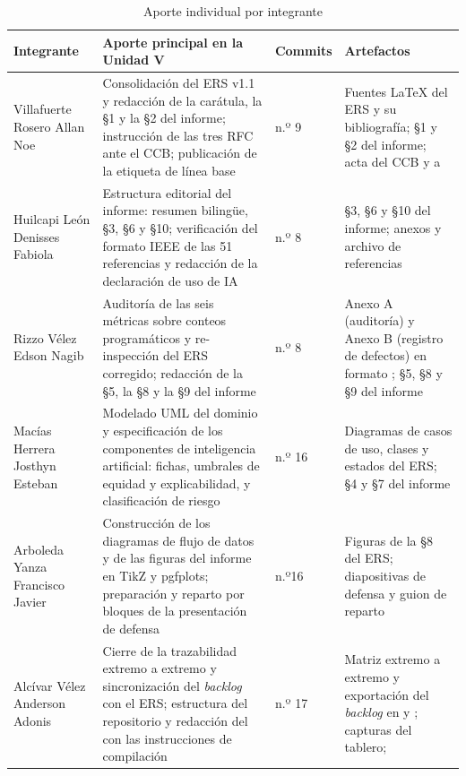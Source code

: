 \begin{table}[H]
\centering\footnotesize
\caption{Aporte individual por integrante}
\label{tab:aporte}
\begin{tabular}{|L{3.1cm}|L{5.2cm}|C{1.5cm}|L{4.8cm}|}
\hline
{}\textbf{Integrante} & \textbf{Aporte principal en la Unidad V} & \textbf{Commits} & \textbf{Artefactos}\\ \hline
Villafuerte Rosero Allan Noe & Consolidación del ERS v1.1 y redacción de la carátula, la \S1 y la \S2 del informe; instrucción de las tres RFC ante el CCB; publicación de la etiqueta de línea base & {n.º 9} & Fuentes \LaTeX{} del ERS y su bibliografía; \S1 y \S2 del informe; acta del CCB y  a \\ \hline
Huilcapi León Denisses Fabiola & Estructura editorial del informe: resumen bilingüe, \S3, \S6 y \S10; verificación del formato IEEE de las 51 referencias y redacción de la declaración de uso de IA & {n.º 8} & \S3, \S6 y \S10 del informe; anexos y archivo  de referencias\\ \hline
Rizzo Vélez Edson Nagib & Auditoría de las seis métricas sobre conteos programáticos y re-inspección del ERS corregido; redacción de la \S5, la \S8 y la \S9 del informe & {n.º 8} & Anexo A (auditoría) y Anexo B (registro de defectos) en formato ; \S5, \S8 y \S9 del informe\\ \hline
Macías Herrera Josthyn Esteban & Modelado UML del dominio y especificación de los componentes de inteligencia artificial: fichas, umbrales de equidad y explicabilidad, y clasificación de riesgo & {n.º 16} & Diagramas de casos de uso, clases y estados del ERS; \S4 y \S7 del informe\\ \hline
Arboleda Yanza Francisco Javier & Construcción de los diagramas de flujo de datos y de las figuras del informe en TikZ y pgfplots; preparación y reparto por bloques de la presentación de defensa & {n.º16} & Figuras de la \S8 del ERS; diapositivas de defensa y guion de reparto\\ \hline
Alcívar Vélez Anderson Adonis & Cierre de la trazabilidad extremo a extremo y sincronización del \emph{backlog} con el ERS; estructura del repositorio y redacción del  con las instrucciones de compilación & {n.º 17} & Matriz extremo a extremo y exportación del \emph{backlog} en  y ; capturas del tablero; \\ \hline
\end{tabular}
\end{table}

